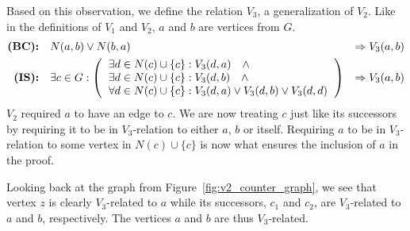 Based on this observation, we define the relation $V_3$, a generalization of $V_2$.
Like in the definitions of $V_1$ and $V_2$, $a$ and $b$ are vertices from $G$.
\begin{align}
  \begin{aligned}
    \textbf{(BC):}&\quad N(a,b) \vee N(b,a) &\Rightarrow V_3(a,b)\\
    \textbf{(IS):}&\quad \exists c \in G:
    \left ( \begin{tabular}{l}
    $\exists d \in N(c) \cup \{ c \} : V_3(d,a) \quad \wedge$\\
    $\exists d \in N(c) \cup \{ c \} : V_3(d,b) \quad \wedge$\\
    $\forall d \in N(c) \cup \{ c \} : V_3(d,a) \vee V_3(d,b) \vee V_3(d,d)$
    \end{tabular} \right )
    &\Rightarrow V_3(a,b)
  \end{aligned}\label{eq:def_v3}
\end{align}
$V_2$ required $a$ to have an edge to $c$.
We are now treating $c$ just like its successors by requiring it to be in $V_3$-relation to either $a$, $b$ or itself.
Requiring $a$ to be in $V_3$-relation to some vertex in $N(c) \cup \{ c \}$ is now what ensures the inclusion of $a$ in the proof.

Looking back at the graph from Figure~\ref{fig:v2_counter_graph}, we see that vertex $z$ is clearly $V_3$-related to $a$ while its successors, $c_1$ and $c_2$, are $V_3$-related to $a$ and $b$, respectively.
The vertices $a$ and $b$ are thus $V_3$-related.

